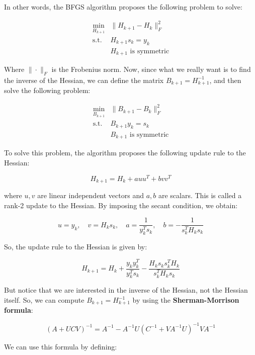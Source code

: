 In other words, the BFGS algorithm proposes the following problem to solve:

\begin{align*}
    \min_{H_{k+1}} &\| H_{k+1} - H_k \|_F^2\\
    \text{s.t. } &H_{k+1} s_{k} = y_{k}\\
                 &H_{k+1} \text{ is symmetric}
\end{align*}

Where $\| \cdot \|_F$ is the Frobenius norm. Now, since what we really want is to find the inverse 
of the Hessian, we can define the matrix $B_{k+1} = H_{k+1}^{-1}$, and then solve the following problem:

\begin{align*}
    \min_{B_{k+1}} &\| B_{k+1} - B_k \|_F^2\\
    \text{s.t. } &B_{k+1} y_{k} = s_{k}\\
                 &B_{k+1} \text{ is symmetric}
\end{align*}

To solve this problem, the algorithm proposes the following update rule to the Hessian:

$$H_{k+1} = H_k + a u u^T + b v v^T$$

where $u, v$ are linear independent vectors and $a, b$ are scalars. This is called a rank-2 update
to the Hessian. By imposing the secant condition, we obtain:

\begin{equation*}
    u = y_k, \quad v = H_k s_k, \quad a = \frac{1}{y_k^T s_k}, \quad b = - \frac{1}{s_k^T H_k s_k}
\end{equation*}

So, the update rule to the Hessian is given by:

\begin{equation}
    H_{k+1} = H_k + \frac{y_k y_k^T}{y_k^T s_k} - \frac{H_k s_k s_k^T H_k}{s_k^T H_k s_k}
\end{equation}

But notice that we are interested in the inverse of the Hessian, not the Hessian itself. So, we can
compute $B_{k+1} = H_{k+1}^{-1}$ by using the \textbf{Sherman-Morrison formula}:

\begin{equation}
    (A + UCV)^{-1} = A^{-1} - A^{-1} U (C^{-1} + V A^{-1} U)^{-1} V A^{-1}
\end{equation}

We can use this formula by defining:

